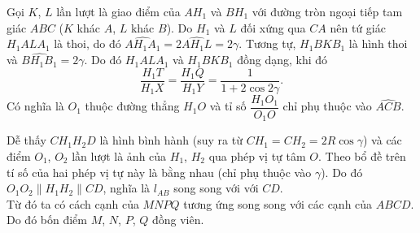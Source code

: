 \begin{ex}
{\begin{bode}
\begin{center}
			\end{center}
			Gọi $K$, $L$ lần lượt là giao điểm của $AH_1$ và $BH_1$ với đường tròn ngoại tiếp tam giác $ABC$ ($K$ khác $A$, $L$ khác $B$). Do $H_1$ và $L$ đối xứng qua $CA$ nên tứ giác $H_1ALA_1$ là thoi, do đó $\widehat{AH_1A_1}=2\widehat{AH_1L}=2\gamma$. Tương tự, $H_1BKB_1$ là hình thoi và $\widehat{BH_1B_1}=2\gamma$. Do đó $H_1ALA_1$ và $H_1BKB_1$ đồng dạng, khi đó
			\[\dfrac{H_1T}{H_1X}=\dfrac{H_1Q}{H_1Y}=\dfrac{1}{1+2\cos 2\gamma}.\]
			Có nghĩa là $O_1$ thuộc đường thẳng $H_1O$ và tỉ số $\dfrac{H_1O_1}{O_1O}$ chỉ phụ thuộc vào $\widehat{ACB}$.
		\end{bode} 
	Dễ thấy $CH_1H_2D$ là hình bình hành (suy ra từ $CH_1=CH_2=2R\cos\gamma$) và các điểm $O_1$, $O_2$ lần lượt là ảnh của $H_1$, $H_2$ qua phép vị tự tâm $O$. Theo bổ đề trên tí số của hai phép vị tự này là bằng nhau (chỉ phụ thuộc vào $\gamma$). Do đó $O_1O_2\parallel H_1H_2\parallel CD$, nghĩa là $l_{AB}$ song song với với $CD$.\\
	Từ đó ta có cách cạnh của $MNPQ$ tương ứng song song với các cạnh của $ABCD$. Do đó bốn điểm $M$, $N$, $P$, $Q$ đồng viên.
	}
\end{ex}

